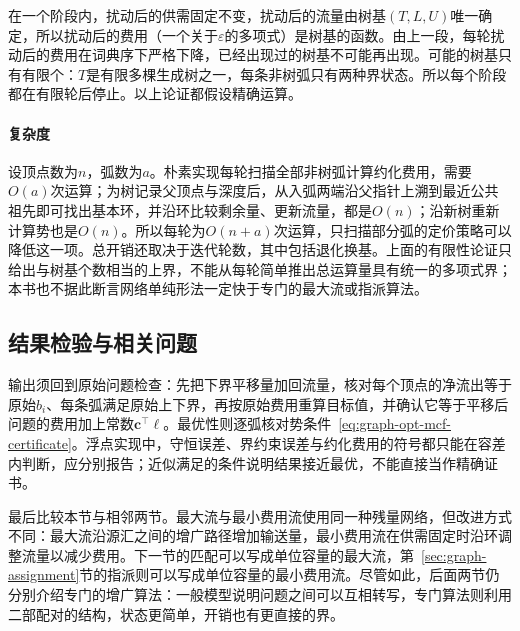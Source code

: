 在一个阶段内，扰动后的供需固定不变，扰动后的流量由树基$(T,L,U)$唯一确定，所以扰动后的费用（一个关于$\varepsilon$的多项式）是树基的函数。由上一段，每轮扰动后的费用在词典序下严格下降，已经出现过的树基不可能再出现。可能的树基只有有限个：$T$是有限多棵生成树之一，每条非树弧只有两种界状态。所以每个阶段都在有限轮后停止。以上论证都假设精确运算。

\paragraph{复杂度}
设顶点数为$n$，弧数为$a$。朴素实现每轮扫描全部非树弧计算约化费用，需要$O(a)$次运算；为树记录父顶点与深度后，从入弧两端沿父指针上溯到最近公共祖先即可找出基本环，并沿环比较剩余量、更新流量，都是$O(n)$；沿新树重新计算势也是$O(n)$。所以每轮为$O(n+a)$次运算，只扫描部分弧的定价策略可以降低这一项。总开销还取决于迭代轮数，其中包括退化换基。上面的有限性论证只给出与树基个数相当的上界，不能从每轮简单推出总运算量具有统一的多项式界；本书也不据此断言网络单纯形法一定快于专门的最大流或指派算法。

\subsection{结果检验与相关问题}
\label{sec:graph-opt-ns-analysis}

输出须回到原始问题检查：先把下界平移量加回流量，核对每个顶点的净流出等于原始$b_i$、每条弧满足原始上下界，再按原始费用重算目标值，并确认它等于平移后问题的费用加上常数$\bm c^{\top}\bm\ell$。最优性则逐弧核对势条件~\eqref{eq:graph-opt-mcf-certificate}。浮点实现中，守恒误差、界约束误差与约化费用的符号都只能在容差内判断，应分别报告；近似满足的条件说明结果接近最优，不能直接当作精确证书。

最后比较本节与相邻两节。最大流与最小费用流使用同一种残量网络，但改进方式不同：最大流沿源汇之间的增广路径增加输送量，最小费用流在供需固定时沿环调整流量以减少费用。下一节的匹配可以写成单位容量的最大流，第~\ref{sec:graph-assignment}节的指派则可以写成单位容量的最小费用流。尽管如此，后面两节仍分别介绍专门的增广算法：一般模型说明问题之间可以互相转写，专门算法则利用二部配对的结构，状态更简单，开销也有更直接的界。
